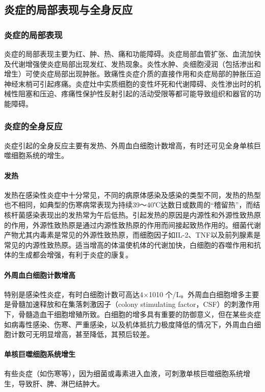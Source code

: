 \subsection{炎症的局部表现与全身反应}

\subsubsection{炎症的局部表现}

炎症的局部表现主要为红、肿、热、痛和功能障碍。炎症局部血管扩张、血流加快及代谢增强使炎症局部出现发红、发热现象。炎性水肿、炎细胞浸润（包括渗出和增生）可使炎症局部出现肿胀。致痛性炎症介质的直接作用和炎症局部的肿胀压迫神经末梢可引起疼痛。炎症灶中实质细胞的变性坏死和代谢障碍、炎性渗出时的机械性阻塞和压迫、疼痛性保护性反射引起的活动受限等都可能导致组织和器官的功能障碍。

\subsubsection{炎症的全身反应}

炎症引起的全身反应主要有发热、外周血白细胞计数增高，有时还可见全身单核巨噬细胞系统的增生。

\paragraph{发热}
发热在感染性炎症中十分常见，不同的病原体感染及感染的类型不同，发热的热型也不相同，如典型的伤寒病常表现为持续39～40℃达数日或数周的“稽留热”，而结核杆菌感染表现出的发热常为午后低热。引起发热的原因是内源性和外源性致热原的作用，外源性致热原是通过内源性致热原的作用而间接起致热作用的。细菌代谢产物尤其内毒素是常见的外源性致热原，而细胞因子如IL-2、TNF以及前列腺素是常见的内源性致热原。适当增高的体温使机体的代谢加快，白细胞的吞噬作用和抗体的生成都会增强，有利于炎症的康复。

\paragraph{外周血白细胞计数增高}
特别是感染性炎症，有时白细胞计数可高达4×10{10}
个/L。外周血白细胞增多主要是骨髓加速释放和在集落刺激因子（colony
stimulating
factor，CSF）的刺激作用下，骨髓造血干细胞增殖所致。白细胞的增多具有重要的防御意义，但在某些炎症如病毒性感染、伤寒、严重感染，以及机体抵抗力极度降低的情况下，外周血白细胞计数可无明显增高，甚至降低，其预后较差。

\paragraph{单核巨噬细胞系统增生}
有些炎症（如伤寒等），因为细菌或毒素进入血液，可刺激单核巨噬细胞系统增生，导致肝、脾、淋巴结肿大。

